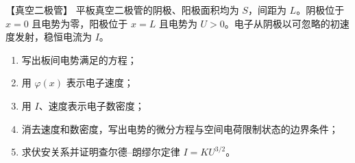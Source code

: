 \begin{origexamplebox}{【真空二极管】}\label{appE:ex:s22-33-4}
平板真空二极管的阴极、阳极面积均为 $S$，间距为 $L$。阴极位于 $x=0$ 且电势为零，阳极位于
$x=L$ 且电势为 $U>0$。电子从阴极以可忽略的初速度发射，稳恒电流为 $I$。
\begin{enumerate}[label=(\arabic*),leftmargin=2.2em]
  \item 写出板间电势满足的方程；
  \item 用 $\varphi(x)$ 表示电子速度；
  \item 用 $I$、速度表示电子数密度；
  \item 消去速度和数密度，写出电势的微分方程与空间电荷限制状态的边界条件；
  \item 求伏安关系并证明查尔德--朗缪尔定律 $I=KU^{3/2}$。
\end{enumerate}

\end{origexamplebox}

